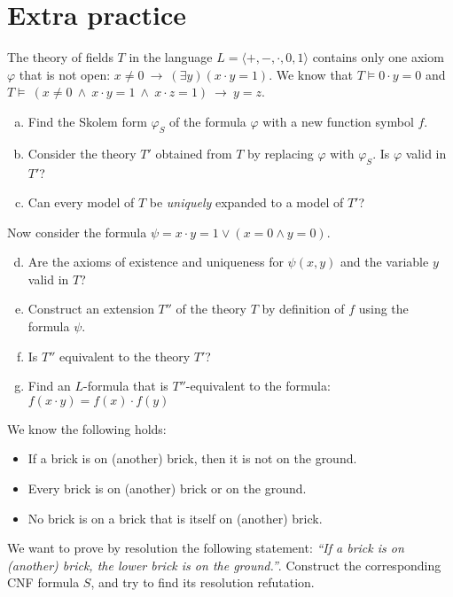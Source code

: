         
\section*{Extra practice}


\begin{problem}

    The theory of fields $T$ in the language $L=\langle +,-,\cdot,0,1\rangle$ contains only one axiom $\varphi$ that is not open: $x\neq 0\ \to\ (\exists y)(x\cdot y=1)$. We know that $T\models 0\cdot y=0$ and $T\models\ (x\ne 0\ \wedge\ x\cdot y=1\ \wedge\ x\cdot z=1)\ \to\ y=z$.
    \begin{enumerate}[(a)]
        \item Find the Skolem form $\varphi_S$ of the formula $\varphi$ with a new function symbol $f$.
        \item Consider the theory $T'$ obtained from $T$ by replacing $\varphi$ with $\varphi_S$. Is $\varphi$ valid in $T'$?
        \item Can every model of $T$ be \emph{uniquely} expanded to a model of $T'$?
    \end{enumerate}
    Now consider the formula $\psi=x\cdot y=1\vee  (x=0 \wedge y=0)$.
    \begin{enumerate}[(a)]
        \setcounter{enumi}{3}
        \item Are the axioms of existence and uniqueness for $\psi(x,y)$ and the variable $y$ valid in $T$?
        \item Construct an extension $T''$ of the theory $T$ by definition of $f$ using the formula $\psi$.
        \item Is $T''$ equivalent to the theory $T'$?
        \item Find an $L$-formula that is $T''$-equivalent to the formula:
        $f(x\cdot y)=f(x)\cdot f(y)$
    \end{enumerate}

\end{problem}


\medskip\begin{problem} We know the following holds:
    \begin{itemize}\it
        \item If a brick is on (another) brick, then it is not on the ground.
        \item Every brick is on (another) brick or on the ground.
        \item No brick is on a brick that is itself on (another) brick.
    \end{itemize}
    We want to prove by resolution the following statement: {\it ``If a brick is on (another) brick, the lower brick is on the ground.''}. Construct the corresponding CNF formula $S$, and try to find its resolution refutation.
\end{problem}

